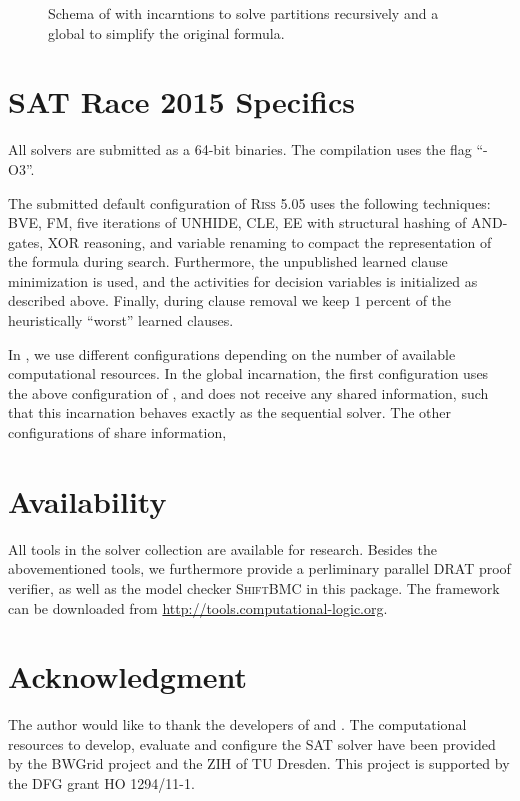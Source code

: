 \documentclass[conference]{IEEEtran}
\begin{document}
\begin{figure}[t]
 
\caption{Schema of \pcasso with \priss incarntions to solve partitions recursively and a global \priss to simplify the original formula.}
\end{figure}


 
\section{SAT Race 2015 Specifics}

All solvers are submitted as a 64-bit binaries. 
The compilation uses the flag ``-O3''. 

The submitted default configuration of \textsc{Riss 5.05} uses the following techniques:
%
BVE, 
FM, 
five iterations of UNHIDE,
CLE,
EE with structural hashing of AND-gates,
XOR reasoning, 
and variable renaming to compact the representation of the formula during search. 
Furthermore, the unpublished learned clause minimization is used, and the activities for decision variables is initialized as described above. 
Finally, during clause removal we keep $1$ percent of the heuristically ``worst'' learned clauses.

In \pcasso, we use different configurations depending on the number of available computational resources. 
In the global \priss incarnation, the first configuration uses the above configuration of \riss, and does not receive any shared information, such that this incarnation behaves exactly as the sequential solver. 
The other configurations of \priss share information,


\section{Availability}

All tools in the solver collection are available for research. 
Besides the abovementioned tools, we furthermore provide a perliminary parallel DRAT proof verifier, as well as the model checker \textsc{ShiftBMC} in this package.
The framework can be downloaded from \url{http://tools.computational-logic.org}.

\section*{Acknowledgment}
The author would like to thank the developers of \glucose and \minisat. 
The computational resources to develop, evaluate and configure the SAT solver have been provided by the BWGrid \cite{bwgrid} project and the ZIH of TU Dresden. 
This project is supported by the DFG grant HO 1294/11-1. 



% 


\end{document}
